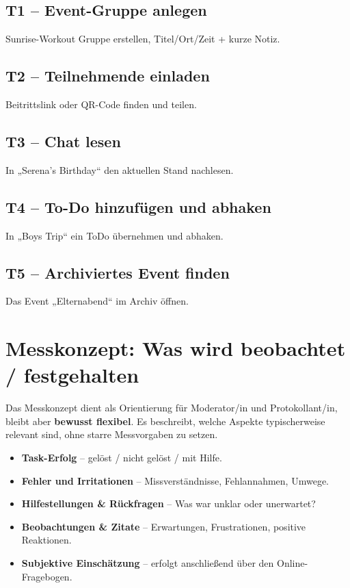 \documentclass[11pt,a4paper]{article}
\begin{document}
\subsection*{T1 – Event-Gruppe anlegen}
Sunrise-Workout Gruppe erstellen, Titel/Ort/Zeit + kurze Notiz.

\subsection*{T2 – Teilnehmende einladen}
Beitrittslink oder QR-Code finden und teilen.

\subsection*{T3 – Chat lesen}
In „Serena's Birthday“ den aktuellen Stand nachlesen.

\subsection*{T4 – To-Do hinzufügen und abhaken}
In „Boys Trip“ ein ToDo übernehmen und abhaken.

\subsection*{T5 – Archiviertes Event finden}
Das Event „Elternabend“ im Archiv öffnen.


\section{Messkonzept: Was wird beobachtet / festgehalten}

Das Messkonzept dient als Orientierung für Moderator/in und Protokollant/in,
bleibt aber \textbf{bewusst flexibel}. Es beschreibt, welche Aspekte
typischerweise relevant sind, ohne starre Messvorgaben zu setzen.

\begin{itemize}
  \item \textbf{Task-Erfolg} – gelöst / nicht gelöst / mit Hilfe.
  \item \textbf{Fehler und Irritationen} – Missverständnisse, Fehlannahmen, Umwege.
  \item \textbf{Hilfestellungen \& Rückfragen} – Was war unklar oder unerwartet?
  \item \textbf{Beobachtungen \& Zitate} – Erwartungen, Frustrationen, positive Reaktionen.
  \item \textbf{Subjektive Einschätzung} – erfolgt anschließend über den Online-Fragebogen.
\end{itemize}
\end{document}

